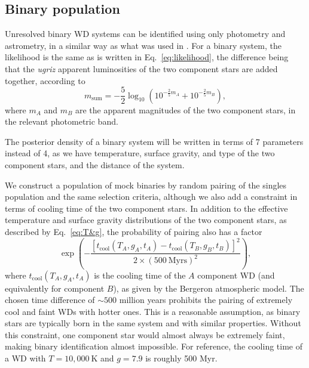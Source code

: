 \documentclass[fleqn,usenatbib]{mnras}
\newcommand{\Teff}{T}
\newcommand{\logg}{g}
\newcommand{\K}{\text{K}}
\begin{document}
\subsection{Binary population}

Unresolved binary WD systems can be identified using only photometry and astrometry, in a similar way as what was used in \cite{2018ApJ...857..114W}. For a binary system, the likelihood is the same as is written in Eq.~\eqref{eq:likelihood}, the difference being that the \emph{ugriz} apparent luminosities of the two component stars are added together, according to
\begin{equation}
	m_\text{sum} = - \frac{5}{2}\log_{10}\left( 10^{-\frac{2}{5}m_{A}}+10^{-\frac{2}{5}m_{B}}  \right),
\end{equation}
where $m_A$ and $m_B$ are the apparent magnitudes of the two component stars, in the relevant photometric band.

The posterior density of a binary system will be written in terms of 7 parameters instead of 4, as we have temperature, surface gravity, and type of the two component stars, and the distance of the system.

We construct a population of mock binaries by random pairing of the singles population and the same selection criteria, although we also add a constraint in terms of cooling time of the two component stars. In addition to the effective temperature and surface gravity distributions of the two component stars, as described by Eq.~\eqref{eq:T&g}, the probability of pairing also has a factor
\begin{equation}\label{eq:time_difference}
	\exp\left(
	-\frac{[t_\text{cool}(\Teff_A,\logg_A,t_A)-t_\text{cool}(\Teff_B,\logg_B,t_B)]^2}{2\times ( 500~\text{Myrs})^2}
	\right),
\end{equation}
where $t_\text{cool}(\Teff_A,\logg_A,t_A)$ is the cooling time of the $A$ component WD (and equivalently for component $B$), as given by the Bergeron atmospheric model. The chosen time difference of $\sim 500$ million years prohibits the pairing of extremely cool and faint WDs with hotter ones. This is a reasonable assumption, as binary stars are typically born in the same system and with similar properties. Without this constraint, one component star would almost always be extremely faint, making binary identification almost impossible. For reference, the cooling time of a WD with $\Teff=10,000~\K$ and $\logg=7.9$ is roughly 500 Myr.
\end{document}
